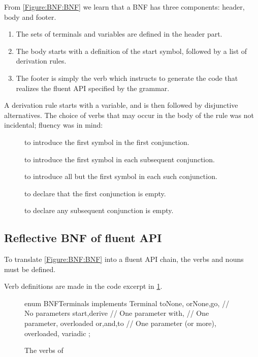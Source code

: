 From \cref{Figure:BNF:BNF} we learn 
  that a BNF has three components: header, body and footer.
  \begin{enumerate}
    \item The sets of terminals and variables are defined in the header part.
    \item The body starts with a definition of the start symbol, followed by a list of derivation
  rules. 
\item The footer is simply the verb  which instructs \SELF
  to generate the code that realizes the fluent API specified by the grammar.
  \end{enumerate}

A derivation rule starts with a variable, and is then followed by disjunctive alternatives.
The choice of verbs that may occur in the body of the rule was not incidental; 
  fluency was in mind:
\begin{description}
  \item[] to introduce the first symbol in the first conjunction.
  \item[] to introduce the first symbol in each subsequent conjunction.
  \item[] to introduce all but the first symbol in each such conjunction.
  \item[] to declare that the first conjunction is empty.
  \item[] to declare any subsequent conjunction is empty.
\end{description}

\subsection{Reflective BNF of fluent API}

To translate \cref{Figure:BNF:BNF} into a fluent
API chain, the verbs and nouns must be defined.

Verb definitions are made in the code excerpt in
\cref{Figure:Verbs}.

\begin{figure}[H]
  \begin{JAVA}[style=code]
enum BNFTerminals implements Terminal {
  toNone, orNone,go, // No parameters
  start,derive            // One parameter 
  with,             // One parameter, overloaded 
  or,and,to        // One parameter (or more), overloaded, variadic 
  ;
} \end{JAVA}
  \caption{The verbs of \SELF}
  \label{Figure:Verbs}
\end{figure}

